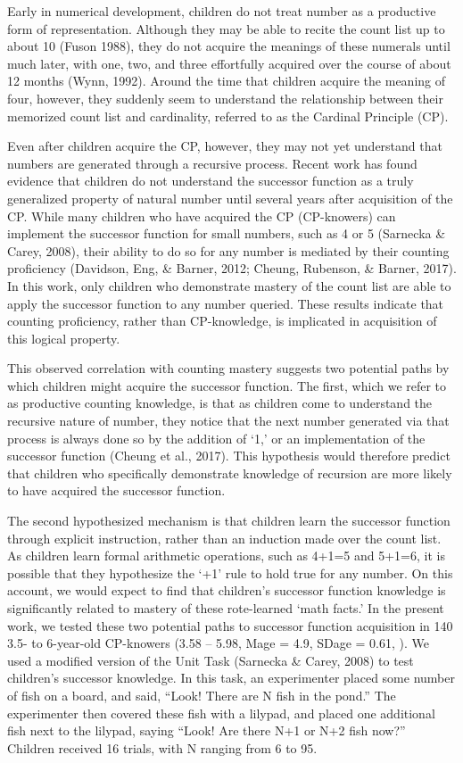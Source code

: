 \documentclass[10pt, letterpaper]{article}
\begin{document}
Early in numerical development, children do not treat number as a
productive form of representation. Although they may be able to recite
the count list up to about 10 (Fuson 1988), they do not acquire the
meanings of these numerals until much later, with one, two, and three
effortfully acquired over the course of about 12 months (Wynn, 1992).
Around the time that children acquire the meaning of four, however, they
suddenly seem to understand the relationship between their memorized
count list and cardinality, referred to as the Cardinal Principle (CP).

Even after children acquire the CP, however, they may not yet understand
that numbers are generated through a recursive process. Recent work has
found evidence that children do not understand the successor function as
a truly generalized property of natural number until several years after
acquisition of the CP. While many children who have acquired the CP
(CP-knowers) can implement the successor function for small numbers,
such as 4 or 5 (Sarnecka \& Carey, 2008), their ability to do so for any
number is mediated by their counting proficiency (Davidson, Eng, \&
Barner, 2012; Cheung, Rubenson, \& Barner, 2017). In this work, only
children who demonstrate mastery of the count list are able to apply the
successor function to any number queried. These results indicate that
counting proficiency, rather than CP-knowledge, is implicated in
acquisition of this logical property.

This observed correlation with counting mastery suggests two potential
paths by which children might acquire the successor function. The first,
which we refer to as productive counting knowledge, is that as children
come to understand the recursive nature of number, they notice that the
next number generated via that process is always done so by the addition
of `1,' or an implementation of the successor function (Cheung et al.,
2017). This hypothesis would therefore predict that children who
specifically demonstrate knowledge of recursion are more likely to have
acquired the successor function.

The second hypothesized mechanism is that children learn the successor
function through explicit instruction, rather than an induction made
over the count list. As children learn formal arithmetic operations,
such as 4+1=5 and 5+1=6, it is possible that they hypothesize the `+1'
rule to hold true for any number. On this account, we would expect to
find that children's successor function knowledge is significantly
related to mastery of these rote-learned `math facts.' In the present
work, we tested these two potential paths to successor function
acquisition in 140 3.5- to 6-year-old CP-knowers (3.58 -- 5.98, Mage =
4.9, SDage = 0.61, ). We used a modified version of the Unit Task
(Sarnecka \& Carey, 2008) to test children's successor knowledge. In
this task, an experimenter placed some number of fish on a board, and
said, ``Look! There are N fish in the pond.'' The experimenter then
covered these fish with a lilypad, and placed one additional fish next
to the lilypad, saying ``Look! Are there N+1 or N+2 fish now?'' Children
received 16 trials, with N ranging from 6 to 95.
\end{document}
